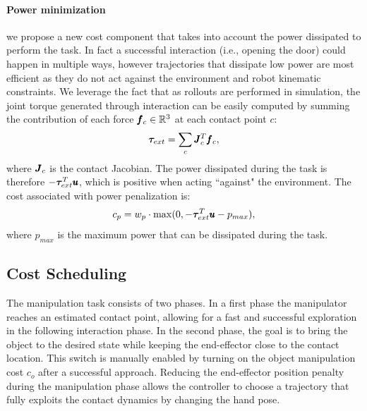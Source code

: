 \paragraph{Power minimization} we propose a new cost component that takes into account the power dissipated to perform the task. In fact a successful interaction (i.e., opening the door) could happen in multiple ways, however trajectories that dissipate low power are most efficient as they do not act against the environment and robot kinematic constraints. We leverage the fact that as rollouts are performed in simulation, the joint torque generated through interaction can be easily computed by summing the contribution of each force $\pmb{f}_c \in \mathbb{R}^{3}$ at each contact point $c$:
\begin{equation}
\boldsymbol{\tau}_{ext} = \sum\limits_{c} \pmb{J}_c^T \pmb{f}_c,    
\end{equation}
where $\pmb{J}_c$ is the contact Jacobian. The power dissipated during the task is therefore $-\boldsymbol{\tau}_{ext}^T\pmb{u}$, which is positive when acting ``against" the environment. The cost associated with power penalization is:
\begin{equation}
   c_p = w_{p} \cdot \max(0, - \boldsymbol{\tau}_{ext}^T\pmb{u} - p_{max}),      
 \end{equation}
where $p_{max}$ is the maximum power that can be dissipated during the task.

\subsection{Cost Scheduling}
The manipulation task consists of two phases. In a first phase the manipulator reaches an estimated contact point, allowing for a fast and successful exploration in the following interaction phase. In the second phase, the goal is to bring the object to the desired state while keeping the end-effector close to the contact location. This switch is manually enabled by turning on the object manipulation cost $c_o$ after a successful approach. Reducing the end-effector position penalty during the manipulation phase allows the controller to choose a trajectory that fully exploits the contact dynamics by changing the hand pose.


